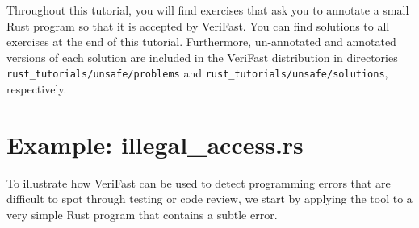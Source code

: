 \documentclass{article}
\begin{document}
Throughout this tutorial, you will find exercises that ask you to annotate a small Rust program so that it is accepted by VeriFast. You can find solutions to all exercises at the end of this tutorial. Furthermore, un-annotated and annotated versions of each solution are included in the VeriFast distribution in directories \verb|rust_tutorials/unsafe/problems| and \verb|rust_tutorials/unsafe/solutions|, respectively.

\section{Example: illegal\_access.rs}

To illustrate how VeriFast can be used to detect programming
errors that are difficult to spot through testing or code
review, we start by applying the tool to a very simple Rust
program that contains a subtle error.
\end{document}
